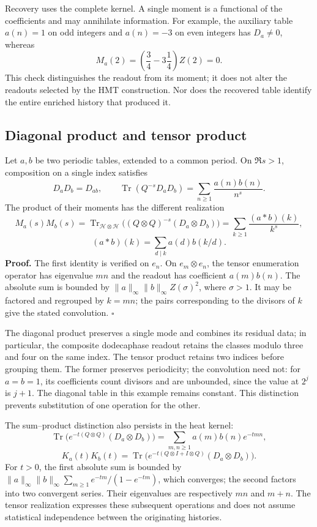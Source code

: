 Recovery uses the complete kernel. A single moment is a functional of
the coefficients and may annihilate information. For example, the
auxiliary table $a(n)=1$ on odd integers and $a(n)=-3$ on even integers
has $D_a\ne0$, whereas
\[
 M_a(2)=\left(\frac34-3\frac14\right)Z(2)=0.
\]
This check distinguishes the readout from its moment; it does not alter
the readouts selected by the HMT construction. Nor does the recovered
table identify the entire enriched history that produced it.

\subsection{Diagonal product and tensor product}
Let $a,b$ be two periodic tables, extended to a common period. On
$\Re s>1$, composition on a single index satisfies
\[
 D_aD_b=D_{ab},\qquad
 \operatorname{Tr}(Q^{-s}D_aD_b)=\sum_{n\geq1}\frac{a(n)b(n)}{n^s}.
\]
The product of their moments has the different realization
\[
 M_a(s)M_b(s)=
 \operatorname{Tr}_{\mathcal H\otimes\mathcal H}
 \bigl((Q\otimes Q)^{-s}(D_a\otimes D_b)\bigr)
 =\sum_{k\geq1}\frac{(a*b)(k)}{k^s},
\]
\[
 (a*b)(k)=\sum_{d\mid k}a(d)b(k/d).
\]
\textbf{Proof.} The first identity is verified on $e_n$. On
$e_m\otimes e_n$, the tensor enumeration operator has eigenvalue $mn$
and the readout has coefficient $a(m)b(n)$. The absolute sum is bounded
by $\|a\|_\infty\|b\|_\infty Z(\sigma)^2$, where $\sigma>1$.
It may be factored and regrouped by $k=mn$; the pairs corresponding to
the divisors of $k$ give the stated convolution. \hfill$\square$

The diagonal product preserves a single mode and combines its residual
data; in particular, the composite dodecaphase readout retains the classes
modulo three and four on the same index. The tensor product retains two
indices before grouping them. The former preserves periodicity; the
convolution need not: for $a=b=1$, its coefficients count divisors and are
unbounded, since the value at $2^j$ is $j+1$. The diagonal table in this
example remains constant. This distinction prevents substitution of one
operation for the other.

The sum--product distinction also persists in the heat kernel:
\[
 \operatorname{Tr}\bigl(e^{-t(Q\otimes Q)}(D_a\otimes D_b)\bigr)
 =\sum_{m,n\geq1}a(m)b(n)e^{-tmn},
\]
\[
 K_a(t)K_b(t)=\operatorname{Tr}
 \bigl(e^{-t(Q\otimes I+I\otimes Q)}(D_a\otimes D_b)\bigr).
\]
For $t>0$, the first absolute sum is bounded by
$\|a\|_\infty\|b\|_\infty\sum_{m\geq1}e^{-tm}/(1-e^{-tm})$,
which converges; the second factors into two convergent series. Their
eigenvalues are respectively $mn$ and $m+n$. The tensor realization
expresses these subsequent operations and does not assume statistical
independence between the originating histories.
